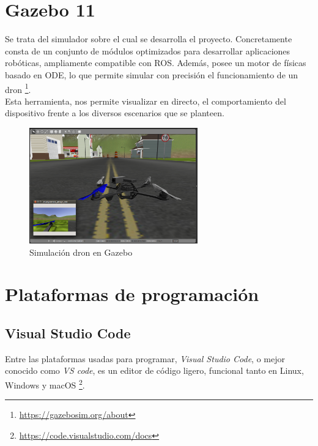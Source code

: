 \section{Gazebo 11}
\label{sec:gazebo}

Se trata del simulador sobre el cual se desarrolla el proyecto. Concretamente consta de un conjunto de módulos optimizados para desarrollar aplicaciones robóticas, ampliamente compatible con \ac{ROS}. Además, posee un motor de físicas basado en ODE, lo que permite simular con precisión el funcionamiento de un dron \footnote[8]{\url{https://gazebosim.org/about}}.\\

Esta herramienta, nos permite visualizar en directo, el comportamiento del dispositivo frente a los diversos escenarios que se planteen.

\begin{figure} [H]
	\begin{center}
	\includegraphics[height=5cm]{imagenes/cap3/2_gazebo_drone.png}
	\end{center}
	\caption[Simulación dron en Gazebo]{Simulación dron en Gazebo}
	\label{fig:gazebo}
\end{figure}

\section{Plataformas de programación}
\label{sec:plataformas_de_programacion}

\subsection{Visual Studio Code}
\label{subsec:visual_studio_code}

Entre las plataformas usadas para programar, \emph{Visual Studio Code}, o mejor conocido como \emph{VS code}, es un editor de código ligero, funcional tanto en Linux, Windows y macOS \footnote[9]{\url{https://code.visualstudio.com/docs}}.\\

